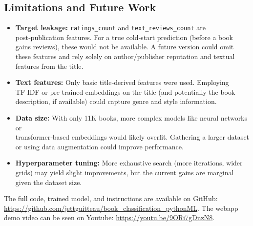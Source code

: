 \documentclass[11pt,a4paper]{article}
\begin{document}
\subsection{Limitations and Future Work}
\begin{itemize}
    \item \textbf{Target leakage:} \texttt{ratings\_count} and \texttt{text\_reviews\_count} are post‑publication features. For a true cold‑start prediction (before a book gains reviews), these would not be available. A future version could omit these features and rely solely on author/publisher reputation and textual features from the title.
    \item \textbf{Text features:} Only basic title‑derived features were used. Employing TF‑IDF or pre‑trained embeddings on the title (and potentially the book description, if available) could capture genre and style information.
    \item \textbf{Data size:} With only 11K books, more complex models like neural networks or \\ transformer‑based embeddings would likely overfit. Gathering a larger dataset or using data augmentation could improve performance.
    \item \textbf{Hyperparameter tuning:} More exhaustive search (more iterations, wider grids) may yield slight improvements, but the current gains are marginal given the dataset size.
\end{itemize}

The full code, trained model, and instructions are available on GitHub: \url{https://github.com/jettguitteau/book_classification_pythonML}.
The webapp demo video can be seen on Youtube: \url{https://youtu.be/9ORi7gDnzN8}.
\end{document}
